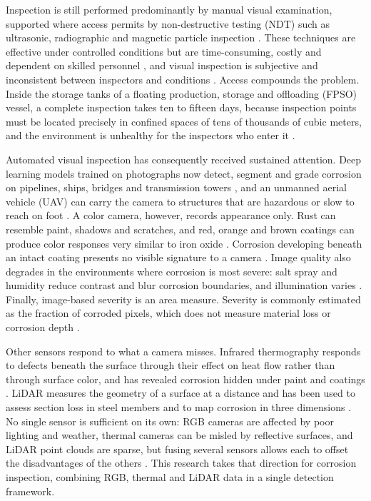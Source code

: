 Inspection is still performed predominantly by manual visual examination,
supported where access permits by non-destructive testing (NDT) such as
ultrasonic, radiographic and magnetic particle inspection \citep{Alvani2026}.
These techniques are effective under controlled conditions but are
time-consuming, costly and dependent on skilled personnel \citep{Alvani2026},
and visual inspection is subjective and inconsistent between inspectors and
conditions \citep{Espinoza2026,Savino2025}. Access compounds the problem.
Inside the storage tanks of a floating production, storage and offloading
(FPSO) vessel, a complete inspection takes ten to fifteen days, because
inspection points must be located precisely in confined spaces of tens of
thousands of cubic meters, and the environment is unhealthy for the inspectors
who enter it \citep{Soares2023}.

Automated visual inspection has consequently received sustained attention.
Deep learning models trained on photographs now detect, segment and grade
corrosion on pipelines, ships, bridges and transmission towers
\citep{Nash2022,Fu2024,Alvani2026,Savino2025}, and an unmanned aerial vehicle
(UAV) can carry the camera to structures that are hazardous or slow to reach
on foot \citep{Savino2025,Nooralishahi2022}. A color camera, however,
records appearance only. Rust can resemble paint, shadows and scratches, and
red, orange and brown coatings can produce color responses very similar to
iron oxide \citep{Espinoza2026,Lavadiya2022}. Corrosion developing beneath an
intact coating presents no visible signature to a camera
\citep{Elizalde2023,Hernndez-Surez2026}. Image quality also degrades in the
environments where corrosion is most severe: salt spray and humidity reduce
contrast and blur corrosion boundaries, and illumination varies
\citep{Mao2026}. Finally, image-based severity is an area measure. Severity is
commonly estimated as the fraction of corroded pixels, which does not measure
material loss or corrosion depth \citep{Alvani2026}.

Other sensors respond to what a camera misses. Infrared thermography responds
to defects beneath the surface through their effect on heat flow rather than
through surface color, and has revealed corrosion hidden under paint and
coatings \citep{Elizalde2023,Lim2021,Doshvarpassand2022}. LiDAR measures
the geometry of a surface at a distance and has been used to assess section
loss in steel members \citep{Maru2025} and to map corrosion in three
dimensions \citep{PimenteldeFigueiredo2025}. No single sensor is sufficient on
its own: RGB cameras are affected by poor lighting and weather, thermal
cameras can be misled by reflective surfaces, and LiDAR point clouds are
sparse, but fusing several sensors allows each to offset the disadvantages of
the others \citep{Tran2024}. This research takes that direction for corrosion
inspection, combining RGB, thermal and LiDAR data in a single detection
framework.

